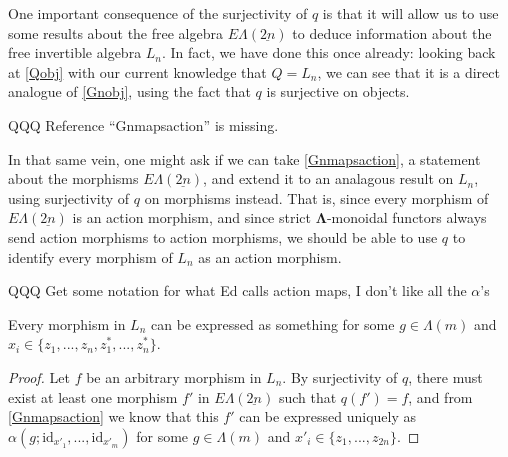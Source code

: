 \documentclass{amsbook} %
\newcommand{\ML}{\mathbf{\Lambda}}
\newcommand{\ELnn}{E\Lambda(\underline{2n})}
\newenvironment{eq*}{\begin{equation*}}{\end{equation*}}
\numberwithin{section}{chapter}
\begin{document}
One important consequence of the surjectivity of $q$ is that it will allow us to use some results about the free algebra $\ELnn$ to deduce information about the free invertible algebra $L_n$. In fact, we have done this once already: looking back at \cref{Qobj} with our current knowledge that $Q = L_n$, we can see that it is a direct analogue of \cref{Gnobj}, using the fact that $q$ is surjective on objects. 


QQQ Reference ``Gnmapsaction'' is missing.


In that same vein, one might ask if we can take \cref{Gnmapsaction}, a statement about the morphisms $\ELnn$, and extend it to an analagous result on $L_n$, using surjectivity of $q$ on morphisms instead. That is, since every morphism of $\ELnn$ is an action morphism, and since strict $\ML$-monoidal functors always send action morphisms to action morphisms, we should be able to use $q$ to identify every morphism of $L_n$ as an action morphism. 


QQQ Get some notation for what Ed calls action maps, I don't like all the $\alpha$'s

\begin{lem} \label{allmapsaction} Every morphism in $L_n$ can be expressed as something
for some $g \in \Lambda(m)$ and $x_i \in \{z_1, ..., z_n, z_1^*, ..., z_n^* \}$.
\end{lem}
\begin{proof}
Let $f$ be an arbitrary morphism in $L_n$. By surjectivity of $q$, there must exist at least one morphism $f'$ in $\ELnn$ such that $q(f') = f$, and from \cref{Gnmapsaction} we know that this $f'$ can be expressed uniquely as $\alpha(g; \mathrm{id}_{x'_1}, ..., \mathrm{id}_{x'_m})$ for some $g \in \Lambda(m)$ and $x'_i \in \{z_1, ..., z_{2n} \}$. %
\end{proof}
\end{document}
